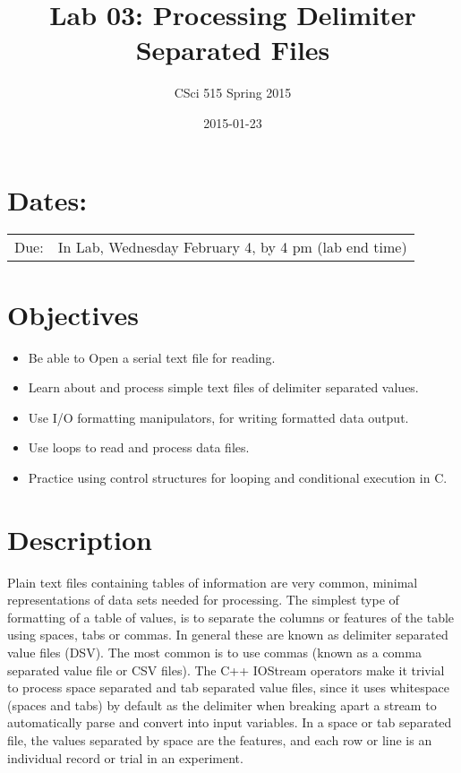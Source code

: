 \documentclass[11pt]{article}
\title{Lab 03: Processing Delimiter Separated Files}
\author{CSci 515 Spring 2015}
\date{2015-01-23}
\begin{document}
\maketitle


\section*{Dates:}
\label{sec-1}


\begin{center}
\begin{tabular}{ll}
 Due:  &  In Lab, Wednesday February 4, by 4 pm (lab end time)  \\
\end{tabular}
\end{center}
\section*{Objectives}
\label{sec-2}

\begin{itemize}
\item Be able to Open a serial text file for reading.
\item Learn about and process simple text files of delimiter separated values.
\item Use I/O formatting manipulators, for writing formatted data output.
\item Use loops to read and process data files.
\item Practice using control structures for looping and conditional
  execution in C.
\end{itemize}
\section*{Description}
\label{sec-3}

Plain text files containing tables of information are very common,
minimal representations of data sets needed for processing.  The
simplest type of formatting of a table of values, is to separate the
columns or features of the table using spaces, tabs or commas. In
general these are known as delimiter separated value files (DSV).  The
most common is to use commas (known as a comma separated value file or
CSV files).  The C++ IOStream operators make it trivial to process
space separated and tab separated value files, since it uses
whitespace (spaces and tabs) by default as the delimiter when breaking
apart a stream to automatically parse and convert into input
variables. In a space or tab separated file, the values separated by
space are the features, and each row or line is an individual record
or trial in an experiment.
\end{document}
